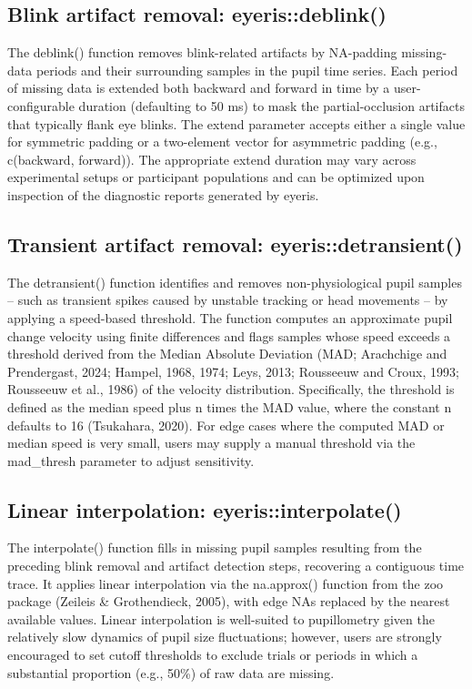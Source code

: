 \subsection{Blink artifact removal: eyeris::deblink()}
The deblink() function removes blink-related artifacts by NA-padding missing-data periods and their surrounding samples in the pupil time series. Each period of missing data is extended both backward and forward in time by a user-configurable duration (defaulting to 50 ms) to mask the partial-occlusion artifacts that typically flank eye blinks. The extend parameter accepts either a single value for symmetric padding or a two-element vector for asymmetric padding (e.g., c(backward, forward)). The appropriate extend duration may vary across experimental setups or participant populations and can be optimized upon inspection of the diagnostic reports generated by eyeris.

\subsection{Transient artifact removal: eyeris::detransient()}
The detransient() function identifies and removes non-physiological pupil samples – such as transient spikes caused by unstable tracking or head movements – by applying a speed-based threshold. The function computes an approximate pupil change velocity using finite differences and flags samples whose speed exceeds a threshold derived from the Median Absolute Deviation (MAD; Arachchige and Prendergast, 2024; Hampel, 1968, 1974; Leys, 2013; Rousseeuw and Croux, 1993; Rousseeuw et al., 1986) of the velocity distribution. Specifically, the threshold is defined as the median speed plus n times the MAD value, where the constant n defaults to 16 (Tsukahara, 2020). For edge cases where the computed MAD or median speed is very small, users may supply a manual threshold via the mad\_thresh parameter to adjust sensitivity.

\subsection{Linear interpolation: eyeris::interpolate()}
The interpolate() function fills in missing pupil samples resulting from the preceding blink removal and artifact detection steps, recovering a contiguous time trace. It applies linear interpolation via the na.approx() function from the zoo package (Zeileis \& Grothendieck, 2005), with edge NAs replaced by the nearest available values. Linear interpolation is well-suited to pupillometry given the relatively slow dynamics of pupil size fluctuations; however, users are strongly encouraged to set cutoff thresholds to exclude trials or periods in which a substantial proportion (e.g., 50\%) of raw data are missing.

